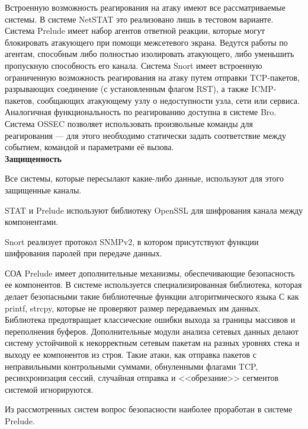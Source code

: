 Встроенную возможность реагирования на атаку имеют все рассматриваемые
системы. В системе NetSTAT это реализовано лишь в тестовом варианте. Система
Prelude имеет набор агентов ответной реакции, которые могут блокировать атакующего
при помощи межсетевого экрана. Ведутся работы по агентам, способным либо
полностью изолировать атакующего, либо уменьшить пропускную способность его
канала. Система Snort имеет встроенную ограниченную возможность реагирования на
атаку путем отправки TCP-пакетов, разрывающих соединение (с установленным
флагом RST), а также ICMP-пакетов, сообщающих атакующему узлу о недоступности
узла, сети или сервиса. Аналогичная функциональность по реагированию доступна в
системе Bro. Система OSSEC позволяет использовать произвольные команды для
реагирования --- для этого необходимо статически задать соответствие между событием,
командой и параметрами её вызова.\\

\textbf{Защищенность}

Все системы, которые пересылают какие-либо данные, используют для этого
защищенные каналы. 

STAT и Prelude используют библиотеку OpenSSL для
шифрования канала между компонентами. 

Snort реализует протокол SNMPv2, в
котором присутствуют функции шифрования паролей при передаче данных.

СОА Prelude имеет дополнительные механизмы, обеспечивающие безопасность ее
компонентов. В системе используется специализированная библиотека, которая делает
безопасными такие библиотечные функции алгоритмического языка С как printf, strcpy,
которые не проверяют размер передаваемых им данных. Библиотека предотвращает
классические ошибки выхода за границы массивов и переполнения буферов.
Дополнительные модули анализа сетевых данных делают систему устойчивой к
некорректным сетевым пакетам на разных уровнях стека и выходу ее компонентов из
строя. Такие атаки, как отправка пакетов с неправильными контрольными суммами,
обнуленными флагами TCP, ресинхронизация сессий, случайная отправка и
<<обрезание>> сегментов системой игнорируются.

Из рассмотренных систем вопрос безопасности наиболее проработан в системе
Prelude.
